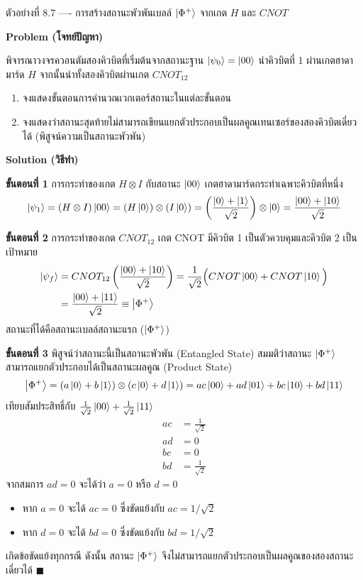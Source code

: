 \begin{psctbox}{ตัวอย่างที่ 8.7 ---- การสร้างสถานะพัวพันเบลล์ $\ket{\Phi^+}$ จากเกต $H$ และ $CNOT$}

\textbf{Problem (โจทย์ปัญหา)}

พิจารณาวงจรควอนตัมสองคิวบิตที่เริ่มต้นจากสถานะฐาน $\ket{\psi_0} = \ket{00}$ นำคิวบิตที่ 1 ผ่านเกตฮาดามาร์ด $H$ จากนั้นนำทั้งสองคิวบิตผ่านเกต $CNOT_{12}$
\begin{enumerate}
    \item จงแสดงขั้นตอนการคำนวณเวกเตอร์สถานะในแต่ละขั้นตอน
    \item จงแสดงว่าสถานะสุดท้ายไม่สามารถเขียนแยกตัวประกอบเป็นผลคูณเทนเซอร์ของสองคิวบิตเดี่ยวได้ (พิสูจน์ความเป็นสถานะพัวพัน)
\end{enumerate}

\textbf{Solution (วิธีทำ)}

\textbf{ขั้นตอนที่ 1} การกระทำของเกต $H \otimes I$ กับสถานะ $\ket{00}$
เกตฮาดามาร์ดกระทำเฉพาะคิวบิตที่หนึ่ง
\begin{equation*}
\ket{\psi_1} = (H \otimes I) \ket{00} = (H\ket{0}) \otimes (I\ket{0}) = \left(\frac{\ket{0}+\ket{1}}{\sqrt{2}}\right) \otimes \ket{0} = \frac{\ket{00} + \ket{10}}{\sqrt{2}}
\end{equation*}

\textbf{ขั้นตอนที่ 2} การกระทำของเกต $CNOT_{12}$
เกต CNOT มีคิวบิต 1 เป็นตัวควบคุมและคิวบิต 2 เป็นเป้าหมาย
\begin{align*}
\ket{\psi_f} &= CNOT_{12} \left( \frac{\ket{00} + \ket{10}}{\sqrt{2}} \right) = \frac{1}{\sqrt{2}} \Big( CNOT\ket{00} + CNOT\ket{10} \Big) \\
&= \frac{\ket{00} + \ket{11}}{\sqrt{2}} \equiv \ket{\Phi^+}
\end{align*}
สถานะที่ได้คือสถานะเบลล์สถานะแรก ($\ket{\Phi^+}$)

\textbf{ขั้นตอนที่ 3} พิสูจน์ว่าสถานะนี้เป็นสถานะพัวพัน (Entangled State)
สมมติว่าสถานะ $\ket{\Phi^+}$ สามารถแยกตัวประกอบได้เป็นสถานะผลคูณ (Product State)
\begin{equation*}
\ket{\Phi^+} = (a\ket{0} + b\ket{1}) \otimes (c\ket{0} + d\ket{1}) = ac\ket{00} + ad\ket{01} + bc\ket{10} + bd\ket{11}
\end{equation*}
เทียบสัมประสิทธิ์กับ $\frac{1}{\sqrt{2}}\ket{00} + \frac{1}{\sqrt{2}}\ket{11}$
\begin{align*}
ac &= \frac{1}{\sqrt{2}} \tag{1} \\
ad &= 0 \tag{2} \\
bc &= 0 \tag{3} \\
bd &= \frac{1}{\sqrt{2}} \tag{4}
\end{align*}
จากสมการ $ad = 0$ จะได้ว่า $a = 0$ หรือ $d = 0$
\begin{itemize}
    \item หาก $a = 0$ จะได้ $ac = 0$ ซึ่งขัดแย้งกับ $ac = 1/\sqrt{2}$
    \item หาก $d = 0$ จะได้ $bd = 0$ ซึ่งขัดแย้งกับ $bd = 1/\sqrt{2}$
\end{itemize}
เกิดข้อขัดแย้งทุกกรณี ดังนั้น สถานะ $\ket{\Phi^+}$ จึงไม่สามารถแยกตัวประกอบเป็นผลคูณของสองสถานะเดี่ยวได้ $\blacksquare$


\end{psctbox}
